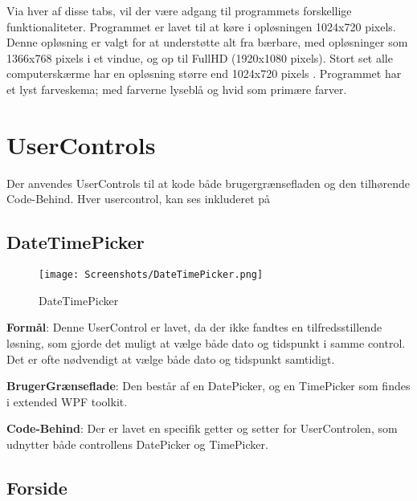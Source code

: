 Via hver af disse tabs, vil der være adgang til programmets forskellige funktionaliteter.
Programmet er lavet til at køre i opløsningen 1024x720 pixels.
Denne opløsning er valgt for at understøtte alt fra bærbare, med opløsninger som 1366x768 pixels i et vindue, og op til FullHD (1920x1080 pixels). 
Stort set alle computerskærme har en opløsning større end 1024x720 pixels \citep{resolutions}. 
Programmet har et lyst farveskema; med farverne lyseblå og hvid som primære farver.

\section{UserControls}
Der anvendes UserControls til at kode både brugergrænsefladen og den tilhørende Code-Behind.
Hver usercontrol, kan ses inkluderet på 

\subsection{DateTimePicker}\label{subsec:DateTimePicker}

\begin{wrapfigure}{r}{0.5\textwidth}
    \label{img:DateTimePicker}
    \vspace{-20pt}
    \begin{center}
        \texttt{[image: Screenshots/DateTimePicker.png]}
    \end{center}
    \vspace{-15pt}
    \caption{DateTimePicker}
    \vspace{-30pt}
\end{wrapfigure}

\textbf{Formål}: 
Denne UserControl er lavet, da der ikke fandtes en tilfredsstillende løsning, som gjorde det muligt at vælge både dato og tidspunkt i samme control. 
Det er ofte nødvendigt at vælge både dato og tidspunkt samtidigt. 

\textbf{BrugerGrænseflade}: 
Den består af en DatePicker, og en TimePicker som findes i extended WPF toolkit.

\textbf{Code-Behind}: 
Der er lavet en specifik getter og setter for UserControlen, som udnytter både controllens DatePicker og TimePicker.


\subsection{Forside}


